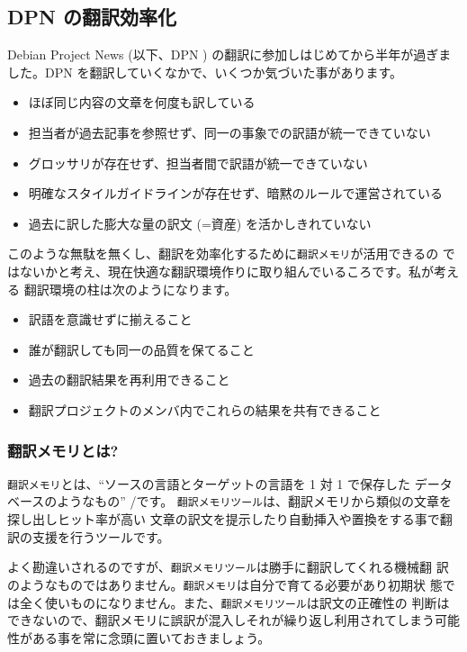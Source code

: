 \documentclass[mingoth,a4paper]{jsarticle}
\begin{document}
\subsection{DPN の翻訳効率化}
Debian Project News (以下、DPN ) の翻訳に参加しはじめてから半年が過ぎま
した。DPN を翻訳していくなかで、いくつか気づいた事があります。

\begin{itemize}
    \item ほぼ同じ内容の文章を何度も訳している
    \item 担当者が過去記事を参照せず、同一の事象での訳語が統一できていない
    \item グロッサリが存在せず、担当者間で訳語が統一できていない
    \item 明確なスタイルガイドラインが存在せず、暗黙のルールで運営されている
    \item 過去に訳した膨大な量の訳文 (=資産) を活かしきれていない
\end{itemize}

このような無駄を無くし、翻訳を効率化するために{\tt 翻訳メモリ}が活用できるの
ではないかと考え、現在快適な翻訳環境作りに取り組んでいるころです。私が考える
翻訳環境の柱は次のようになります。

\begin{itemize}
    \item 訳語を意識せずに揃えること
    \item 誰が翻訳しても同一の品質を保てること
    \item 過去の翻訳結果を再利用できること
    \item 翻訳プロジェクトのメンバ内でこれらの結果を共有できること
\end{itemize}

\subsubsection{翻訳メモリとは?}
{\tt 翻訳メモリ}とは、``ソースの言語とターゲットの言語を 1 対 1 で保存した
データベースのようなもの'' /です。
{\tt 翻訳メモリツール}は、翻訳メモリから類似の文章を探し出しヒット率が高い
文章の訳文を提示したり自動挿入や置換をする事で翻訳の支援を行うツールです。

よく勘違いされるのですが、{\tt 翻訳メモリツール}は勝手に翻訳してくれる機械翻
訳のようなものではありません。{\tt 翻訳メモリ}は自分で育てる必要があり初期状
態では全く使いものになりません。また、{\tt 翻訳メモリツール}は訳文の正確性の
判断はできないので、翻訳メモリに誤訳が混入しそれが繰り返し利用されてしまう可能
性がある事を常に念頭に置いておきましょう。
\end{document}
